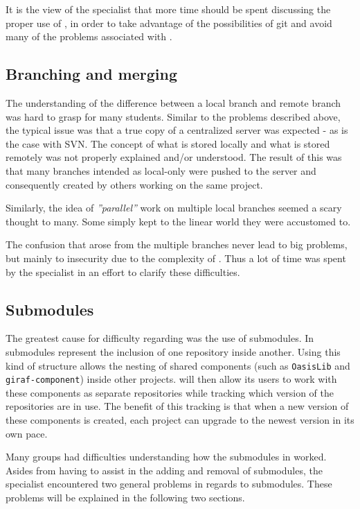 It is the view of the \git{} specialist that more time should be spent discussing the proper use of \git{}, in order to take advantage of the possibilities of git and avoid many of the problems associated with \git{}.

\subsection{Branching and merging}
The understanding of the difference between a local branch and remote branch was hard to grasp for many students.
Similar to the problems described above, the typical issue was that a true copy of a centralized server was expected - as is the case with SVN.
The concept of what is stored locally and what is stored remotely was not properly explained and/or understood.
The result of this was that many branches intended as local-only were pushed to the server and consequently created by others working on the same project.

Similarly, the idea of \textit{''parallel''} work on multiple local branches seemed a scary thought to many.
Some simply kept to the linear world they were accustomed to.

The confusion that arose from the multiple branches never lead to big problems, but mainly to insecurity due to the complexity of \git{}.
Thus a lot of time was spent by the \git{} specialist in an effort to clarify these difficulties.

\subsection{Submodules}
The greatest cause for difficulty regarding \git{} was the use of submodules.
In \git{} submodules represent the inclusion of one repository inside another.
Using this kind of structure allows the nesting of shared components (such as \texttt{OasisLib} and \texttt{giraf-component}) inside other projects.
\Git{} will then allow its users to work with these components as separate repositories while tracking which version of the repositories are in use.
The benefit of this tracking is that when a new version of these components is created, each project can upgrade to the newest version in its own pace.

Many groups had difficulties understanding how the submodules in \git{} worked.
Asides from having to assist in the adding and removal of submodules, the \git{} specialist encountered two general problems in regards to \git{} submodules.
These problems will be explained in the following two sections.

